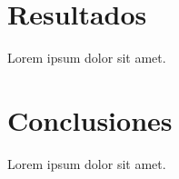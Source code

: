 \documentclass[a4paper,10pt]{article}
\begin{document}

\section{Resultados}

Lorem ipsum dolor sit amet.

\section{Conclusiones}

Lorem ipsum dolor sit amet.
\end{document}
